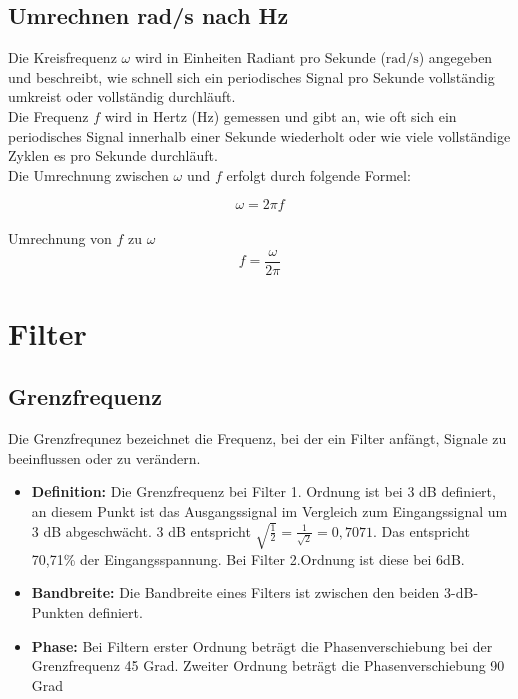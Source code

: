 \subsection{Umrechnen rad/s nach Hz}

Die Kreisfrequenz \( \omega \) wird in Einheiten Radiant pro Sekunde (\(
\text{rad/s} \)) angegeben und beschreibt, wie schnell sich ein periodisches
Signal pro Sekunde vollständig umkreist oder vollständig durchläuft. \\ Die
Frequenz \( f \) wird in Hertz (\( \text{Hz} \)) gemessen und gibt an, wie oft
sich ein periodisches Signal innerhalb einer Sekunde wiederholt oder wie viele
vollständige Zyklen es pro Sekunde durchläuft. \\ Die Umrechnung zwischen \(
\omega \) und \( f \) erfolgt durch folgende Formel:

\[
    \omega = 2 \pi f
\]
\\
Umrechnung von \( f \) zu \( \omega \)
\[
    f = \frac{\omega}{2 \pi}
\]

\section{Filter}
\subsection{Grenzfrequenz}
Die Grenzfrequnez bezeichnet die Frequenz, bei der ein Filter anfängt, Signale
zu beeinflussen oder zu verändern.
\begin{itemize}

    \item \textbf{Definition:} Die Grenzfrequenz bei Filter 1. Ordnung ist bei 3 dB definiert, an diesem Punkt ist das Ausgangssignal im Vergleich zum Eingangssignal um 3 dB abgeschwächt. 3 dB entspricht $\sqrt{\frac{1}{2}} = \frac{1}{\sqrt{2}} = 0,7071$. Das entspricht 70,71\% der Eingangsspannung. Bei Filter 2.Ordnung ist diese bei 6dB.
    \item \textbf{Bandbreite:} Die Bandbreite eines Filters ist zwischen den beiden 3-dB-Punkten definiert.

    \item \textbf{Phase:} Bei Filtern erster Ordnung beträgt die Phasenverschiebung bei der Grenzfrequenz 45 Grad. Zweiter Ordnung beträgt die Phasenverschiebung 90 Grad

\end{itemize}
\newpage
